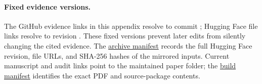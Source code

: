 \paragraph{Fixed evidence versions.}
The GitHub evidence links in this appendix resolve to commit ; Hugging Face file links resolve to revision . These fixed versions prevent later edits from silently changing the cited evidence. The \href{https://github.com/arghya05/commercecore/blob/main/paper/evidence/archive/manifest.json}{archive manifest} records the full Hugging Face revision, file URLs, and SHA-256 hashes of the mirrored inputs. Current manuscript and audit links point to the maintained paper folder; the \href{https://github.com/arghya05/commercecore/blob/main/paper/evidence/build_manifest.json}{build manifest} identifies the exact PDF and source-package contents.

